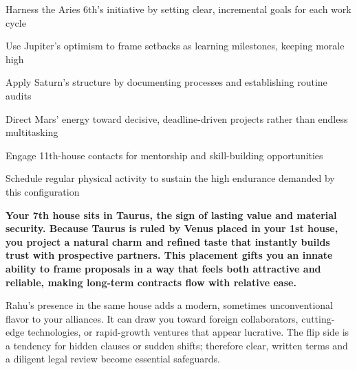 \begin{diamondlist}
  \item {\fontsize{8.5}{12}\selectfont Harness the Aries 6th's initiative by setting clear, incremental goals for each work cycle}
  \item {\fontsize{8.5}{12}\selectfont Use Jupiter's optimism to frame setbacks as learning milestones, keeping morale high}
  \item {\fontsize{8.5}{12}\selectfont Apply Saturn's structure by documenting processes and establishing routine audits}
  \item {\fontsize{8.5}{12}\selectfont Direct Mars' energy toward decisive, deadline-driven projects rather than endless multitasking}
  \item {\fontsize{8.5}{12}\selectfont Engage 11th-house contacts for mentorship and skill-building opportunities}
  \item {\fontsize{8.5}{12}\selectfont Schedule regular physical activity to sustain the high endurance demanded by this configuration}
\end{diamondlist}


\label{topic17}

{\fontsize{9.5}{13.8}\selectfont\bfseries\color{DeepSlate} Your 7th house sits in Taurus, the sign of lasting value and material security. Because Taurus is ruled by Venus placed in your 1st house, you project a natural charm and refined taste that instantly builds trust with prospective partners. This placement gifts you an innate ability to frame proposals in a way that feels both attractive and reliable, making long-term contracts flow with relative ease.}\par\vspace{2mm}

{\fontsize{9}{13}\selectfont Rahu's presence in the same house adds a modern, sometimes unconventional flavor to your alliances. It can draw you toward foreign collaborators, cutting-edge technologies, or rapid-growth ventures that appear lucrative. The flip side is a tendency for hidden clauses or sudden shifts; therefore clear, written terms and a diligent legal review become essential safeguards.}\par\vspace{1.8mm}

